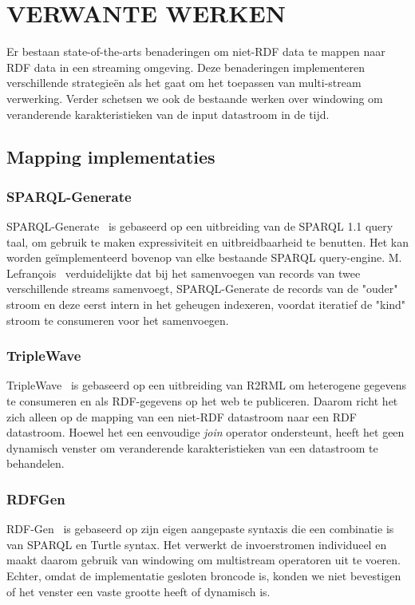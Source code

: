 \section{VERWANTE WERKEN} 
\label{sec:RELATED WORKS} 
Er bestaan state-of-the-arts benaderingen om niet-RDF data te mappen 
naar RDF data in een streaming omgeving. Deze benaderingen 
implementeren verschillende strategieën als het gaat om het toepassen van 
multi-stream verwerking. Verder schetsen we ook
de bestaande werken over windowing om veranderende karakteristieken 
van de input datastroom in de tijd. 

\subsection{Mapping implementaties}
\subsubsection{SPARQL-Generate} 
SPARQL-Generate~\cite{sparql_generate} 
is gebaseerd op een uitbreiding van de SPARQL 1.1 query taal, om gebruik te maken 
expressiviteit en uitbreidbaarheid te benutten. 
Het kan worden geïmplementeerd bovenop 
van elke bestaande SPARQL query-engine. 
M. Lefran\c{c}ois~\cite{sparql_generate} verduidelijkte dat bij het samenvoegen van
records van twee verschillende streams samenvoegt, SPARQL-Generate de records 
van de "ouder" stroom en deze eerst intern in het geheugen indexeren, voordat 
iteratief de "kind" stroom te consumeren voor het samenvoegen. 

\subsubsection{TripleWave} 
TripleWave~\cite{triple_wave} is gebaseerd op een uitbreiding van 
R2RML om heterogene gegevens te consumeren en als RDF-gegevens op het web te publiceren. 
Daarom richt het zich alleen op de mapping van een niet-RDF datastroom naar een RDF datastroom. 
Hoewel het een eenvoudige \emph{join} operator ondersteunt, heeft het geen 
dynamisch venster om veranderende karakteristieken van een datastroom te behandelen.

\subsubsection{RDFGen}
RDF-Gen~\cite{rdf_gen} is gebaseerd op zijn eigen aangepaste syntaxis 
die een combinatie is van SPARQL en Turtle syntax. Het verwerkt de invoerstromen 
individueel en maakt daarom gebruik van windowing om multistream operatoren uit te voeren. 
Echter, omdat de implementatie gesloten broncode is, konden we niet bevestigen of 
het venster een vaste grootte heeft of dynamisch is. 


